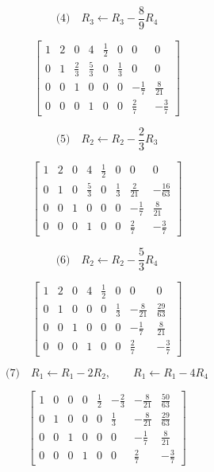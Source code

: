 \documentclass[12pt,a4paper]{article}
\begin{document}
\[ \text{(4)}\quad R_3 \leftarrow R_3 - \frac{8}{9}R_4 \]



\[
\left[
\begin{array}{cccc|cccc}
1 & 2 & 0 & 4 & \tfrac12 & 0 & 0 & 0 \\
0 & 1 & \tfrac{2}{3} & \tfrac{5}{3} & 0 & \tfrac13 & 0 & 0 \\
0 & 0 & 1 & 0 & 0 & 0 & -\tfrac{1}{7} & \tfrac{8}{21} \\
0 & 0 & 0 & 1 & 0 & 0 & \tfrac{2}{7} & -\tfrac{3}{7}
\end{array}
\right]
\]



\[ \text{(5)}\quad R_2 \leftarrow R_2 - \frac{2}{3}R_3 \]



\[
\left[
\begin{array}{cccc|cccc}
1 & 2 & 0 & 4 & \tfrac12 & 0 & 0 & 0 \\
0 & 1 & 0 & \tfrac{5}{3} & 0 & \tfrac13 & \tfrac{2}{21} & -\tfrac{16}{63} \\
0 & 0 & 1 & 0 & 0 & 0 & -\tfrac{1}{7} & \tfrac{8}{21} \\
0 & 0 & 0 & 1 & 0 & 0 & \tfrac{2}{7} & -\tfrac{3}{7}
\end{array}
\right]
\]



\[ \text{(6)}\quad R_2 \leftarrow R_2 - \frac{5}{3}R_4 \]



\[
\left[
\begin{array}{cccc|cccc}
1 & 2 & 0 & 4 & \tfrac12 & 0 & 0 & 0 \\
0 & 1 & 0 & 0 & 0 & \tfrac13 & -\tfrac{8}{21} & \tfrac{29}{63} \\
0 & 0 & 1 & 0 & 0 & 0 & -\tfrac{1}{7} & \tfrac{8}{21} \\
0 & 0 & 0 & 1 & 0 & 0 & \tfrac{2}{7} & -\tfrac{3}{7}
\end{array}
\right]
\]


\[ \text{(7)}\quad R_1 \leftarrow R_1 - 2R_2, \qquad R_1 \leftarrow R_1 - 4R_4 \]



\[
\left[
\begin{array}{cccc|cccc}
1 & 0 & 0 & 0 & \tfrac12 & -\tfrac{2}{3} & -\tfrac{8}{21} & \tfrac{50}{63} \\
0 & 1 & 0 & 0 & 0 & \tfrac13 & -\tfrac{8}{21} & \tfrac{29}{63} \\
0 & 0 & 1 & 0 & 0 & 0 & -\tfrac{1}{7} & \tfrac{8}{21} \\
0 & 0 & 0 & 1 & 0 & 0 & \tfrac{2}{7} & -\tfrac{3}{7}
\end{array}
\right]
\]
\end{document}
